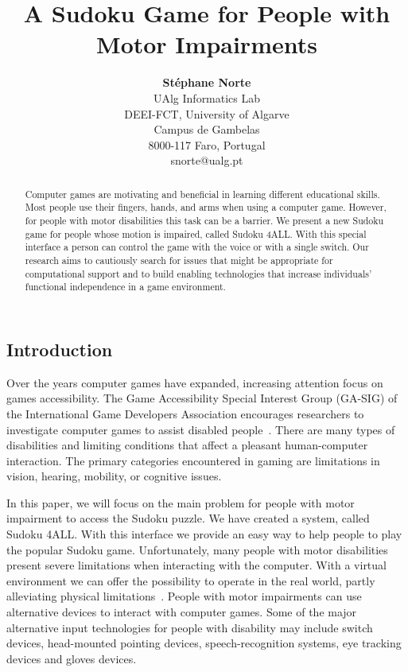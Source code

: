 \documentclass[doublespace,11pt]{article}
\begin{document}
\sloppy
\begin{spacing}{1}






\title{\bf A Sudoku Game for People with Motor Impairments}
\author{    {\bf St\'{e}phane Norte}\\
            \small UAlg Informatics Lab\\
            \small DEEI-FCT, University of Algarve\\
            \small Campus de Gambelas\\
            \small 8000-117 Faro, Portugal\\
            \small snorte@ualg.pt
}
\date{}
\maketitle

\begin{abstract}
Computer games are motivating and beneficial in learning different educational skills.  
Most people use their fingers, hands, and arms when using a computer game. However, 
for people with motor disabilities this task can be a barrier. We present a new Sudoku 
game for people whose motion is impaired, called Sudoku 4ALL. With this special 
interface a person can control the game with the voice or with a single switch. 
Our research aims to cautiously search for issues that might be appropriate for computational 
support and to build enabling technologies that increase individuals' functional independence 
in a game environment. 


\end{abstract}


\section{Introduction}
Over the years computer games have expanded, increasing attention focus on games 
accessibility. The Game Accessibility Special Interest Group (GA-SIG) of the 
International Game Developers Association encourages researchers to investigate 
computer games to assist disabled people~\cite{GA-SIG}. There are many types of disabilities 
and limiting conditions that affect a pleasant human-computer interaction.
The primary categories encountered in gaming are limitations in vision, hearing, 
mobility, or cognitive issues.  

In this paper, we will focus on the main problem for 
people with motor impairment to access the Sudoku puzzle. We have created 
a system, called Sudoku 4ALL. With this interface we provide an easy way to help 
people to play the popular Sudoku game. 
Unfortunately, many people with motor disabilities present severe limitations  
when interacting with the computer. With a virtual 
environment we can offer the possibility to operate in the real world, partly alleviating 
physical limitations~\cite{Kerr:02}. People with motor impairments can use alternative devices to interact 
with computer games. Some of the major alternative input technologies for people with 
disability may include switch devices, head-mounted pointing devices, speech-recognition systems, 
eye tracking devices and gloves devices. 


\end{spacing}
\end{document}
